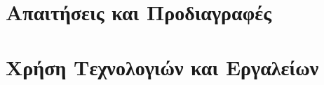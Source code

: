 \documentclass[11pt]{article}
\begin{document}
\section{Απαιτήσεις και Προδιαγραφές}

\section{Χρήση Τεχνολογιών και Εργαλείων}
\end{document}
